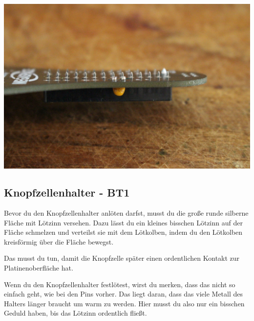 \documentclass{article}
\begin{document}
\begin{minipage}[b]{0.5\textwidth}
	\includegraphics[width=\textwidth]{Bilder2022/IMG_8200.JPG}
\end{minipage}

\subsection{Knopfzellenhalter - BT1}

Bevor du den Knopfzellenhalter anlöten darfst, musst du die große runde silberne Fläche mit Lötzinn versehen. Dazu lässt du ein kleines bisschen Lötzinn auf der Fläche schmelzen und verteilst sie mit dem Lötkolben, indem du den Lötkolben kreisförmig über die Fläche bewegst.

Das musst du tun, damit die Knopfzelle später einen ordentlichen Kontakt zur Platinenoberfläche hat.

Wenn du den Knopfzellenhalter festlötest, wirst du merken, dass das nicht so einfach geht, wie bei den Pins vorher. Das liegt daran, dass das viele Metall des Halters länger braucht um warm zu werden. Hier musst du also nur ein bisschen Geduld haben, bis das Lötzinn ordentlich fließt.

\vspace{1cm}
\end{document}
